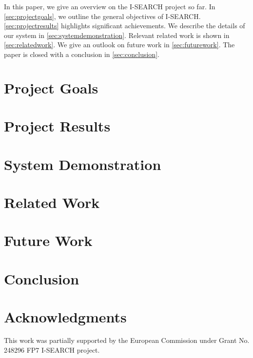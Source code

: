 \documentclass{acm_proc_article-sp}
\newcommand{\inlinelistingsize}{\fontsize{8pt}{11pt}}
\let\oldttdefault\ttdefault
\renewcommand{\ttdefault}{pcr}
\let\oldurl\url
\renewcommand{\url}[1]{\inlinelistingsize\oldurl{#1}}
\begin{document}
In this paper, we give an overview on the \mbox{I-SEARCH} project so far.
In \autoref{sec:projectgoals}, we outline the general objectives of  \mbox{I-SEARCH}.
\autoref{sec:projectresults} highlights significant achievements.
We describe the details of our system in \autoref{sec:systemdemonstration}.
Relevant related work is shown in \autoref{sec:relatedwork}.
We give an outlook on future work in \autoref{sec:futurework}.
The paper is closed with a conclusion in \autoref{sec:conclusion}.

\section{Project Goals} \label{sec:projectgoals}


\section{Project Results} \label{sec:projectresults}


\section{System Demonstration} \label{sec:systemdemonstration}


\section{Related Work} \label{sec:relatedwork}
\cite{multimodalitysun} \cite{mudra2011} \cite{w3cmultimodal2003} \cite{pharos2008}

\section{Future Work} \label{sec:futurework}


\section{Conclusion} \label{sec:conclusion}


\section{Acknowledgments}
This work was partially supported by the European Commission under Grant No. 248296 FP7 \mbox{I-SEARCH} project.

\let\ttdefault\oldttdefault
\let\url\oldurl




\balancecolumns
\end{document}
